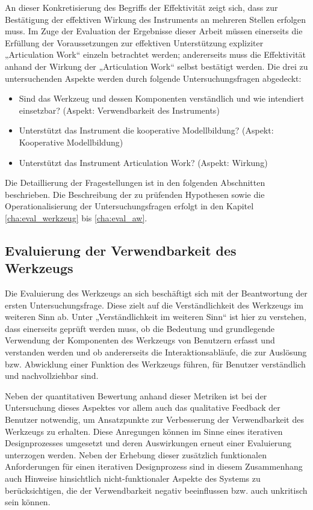 An dieser Konkretisierung des Begriffs der Effektivität zeigt sich, dass zur Bestätigung der effektiven Wirkung des Instruments an mehreren Stellen erfolgen muss. Im Zuge der Evaluation der Ergebnisse dieser Arbeit müssen einerseits die Erfüllung der Voraussetzungen zur effektiven Unterstützung expliziter „Articulation Work“ einzeln betrachtet werden; andererseits muss die Effektivität anhand der Wirkung der „Articulation Work“ selbst bestätigt werden. Die drei zu untersuchenden Aspekte werden durch folgende Untersuchungsfragen abgedeckt:
\begin{itemize}
 \item Sind das Werkzeug und dessen Komponenten verständlich und wie intendiert einsetzbar? (Aspekt: Verwendbarkeit des Instruments)
 \item Unterstützt das Instrument die kooperative Modellbildung? (Aspekt: Kooperative Modellbildung)
 \item Unterstützt das Instrument Articulation Work? (Aspekt: Wirkung)
\end{itemize}

Die Detaillierung der Fragestellungen ist in den folgenden Abschnitten beschrieben. Die Beschreibung der zu prüfenden Hypothesen sowie die Operationalisierung der Untersuchungsfragen erfolgt in den Kapitel \ref{cha:eval_werkzeug} bis \ref{cha:eval_aw}.

\subsection{Evaluierung der Verwendbarkeit des Werkzeugs}
\label{sub:eval_werkzeug}

Die Evaluierung des Werkzeugs an sich beschäftigt sich mit der Beantwortung der ersten Untersuchungsfrage. Diese zielt auf die Verständlichkeit des Werkzeugs im weiteren Sinn ab. Unter „Verständlichkeit im weiteren Sinn“ ist hier zu verstehen, dass einerseits geprüft werden muss, ob die Bedeutung und grundlegende Verwendung der Komponenten des Werkzeugs von Benutzern erfasst und verstanden werden und ob andererseits die Interaktionsabläufe, die zur Auslösung bzw. Abwicklung einer Funktion des Werkzeugs führen, für Benutzer verständlich und nachvollziehbar sind.

Neben der quantitativen Bewertung anhand dieser Metriken ist bei der Untersuchung dieses Aspektes vor allem auch das qualitative Feedback der Benutzer notwendig, um Ansatzpunkte zur Verbesserung der Verwendbarkeit des Werkzeugs zu erhalten. Diese Anregungen können im Sinne eines iterativen Designprozesses umgesetzt und deren Auswirkungen erneut einer Evaluierung unterzogen werden. Neben der Erhebung dieser zusätzlich funktionalen Anforderungen für einen iterativen Designprozess sind in diesem Zusammenhang auch Hinweise hinsichtlich nicht-funktionaler Aspekte des Systems zu berücksichtigen, die der Verwendbarkeit negativ beeinflussen bzw. auch unkritisch sein können.

